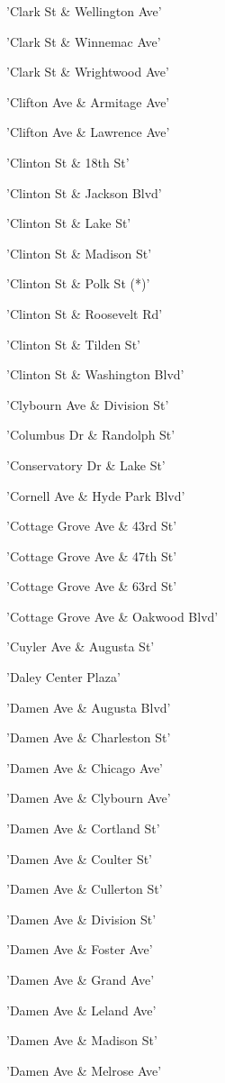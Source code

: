 \documentclass[11pt]{article}
\begin{document}
\begin{enumerate*}
\item 'Clark St \& Wellington Ave'
\item 'Clark St \& Winnemac Ave'
\item 'Clark St \& Wrightwood Ave'
\item 'Clifton Ave \& Armitage Ave'
\item 'Clifton Ave \& Lawrence Ave'
\item 'Clinton St \& 18th St'
\item 'Clinton St \& Jackson Blvd'
\item 'Clinton St \& Lake St'
\item 'Clinton St \& Madison St'
\item 'Clinton St \& Polk St (*)'
\item 'Clinton St \& Roosevelt Rd'
\item 'Clinton St \& Tilden St'
\item 'Clinton St \& Washington Blvd'
\item 'Clybourn Ave \& Division St'
\item 'Columbus Dr \& Randolph St'
\item 'Conservatory Dr \& Lake St'
\item 'Cornell Ave \& Hyde Park Blvd'
\item 'Cottage Grove Ave \& 43rd St'
\item 'Cottage Grove Ave \& 47th St'
\item 'Cottage Grove Ave \& 63rd St'
\item 'Cottage Grove Ave \& Oakwood Blvd'
\item 'Cuyler Ave \& Augusta St'
\item 'Daley Center Plaza'
\item 'Damen Ave \& Augusta Blvd'
\item 'Damen Ave \& Charleston St'
\item 'Damen Ave \& Chicago Ave'
\item 'Damen Ave \& Clybourn Ave'
\item 'Damen Ave \& Cortland St'
\item 'Damen Ave \& Coulter St'
\item 'Damen Ave \& Cullerton St'
\item 'Damen Ave \& Division St'
\item 'Damen Ave \& Foster Ave'
\item 'Damen Ave \& Grand Ave'
\item 'Damen Ave \& Leland Ave'
\item 'Damen Ave \& Madison St'
\item 'Damen Ave \& Melrose Ave'

\end{enumerate*}
\end{document}
